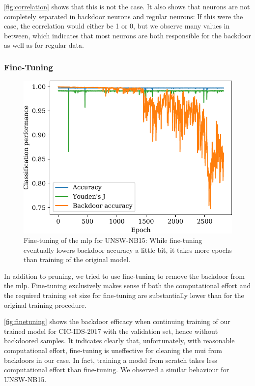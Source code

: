 \documentclass[9pt,sigconf,letterpaper,dvipsnames\ifx\removeHeaders\tempYes ,nonacm\fi]{acmart}
\newcommand\note[2]{{\color{#1}#2}}
\newcommand\todo[1]{{\note{red}{TODO: #1}}}
\newcommand{\unsw}{UNSW-NB15}
\newcommand{\cic}{CIC-IDS-2017}
\begin{document}
\autoref{fig:correlation} shows that this is not the case. It also shows that neurons are not completely separated in backdoor neurons and regular neurons: If this were the case, the correlation would either be 1 or 0, but we observe many values in between, which indicates that most neurons are both responsible for the backdoor as well as for regular data.

\subsubsection{Fine-Tuning}
\begin{figure}[b]
\includegraphics[width=\columnwidth]{figures/finetuning_2017.pdf}
\caption{Fine-tuning of the \gls{mlp} for \unsw{}: While fine-tuning eventually lowers backdoor accuracy a little bit, it takes more epochs than training of the original model.}
\label{fig:finetuning}
\end{figure}
In addition to pruning, we tried to use fine-tuning to remove the backdoor from the \gls{mlp}. %
Fine-tuning exclusively makes  sense if both the computational effort and the required training set size for fine-tuning are substantially lower than for the original training procedure.

\autoref{fig:finetuning} shows the backdoor efficacy when continuing training of our trained model for \cic{} with the validation set, hence without backdoored samples.
It indicates clearly that, unfortunately, with reasonable computational effort, fine-tuning is uneffective for cleaning the \gls{mui} from backdoors in our case. In fact, training a model from scratch takes less computational effort than fine-tuning. We observed a similar behaviour for \unsw{}.
\end{document}

